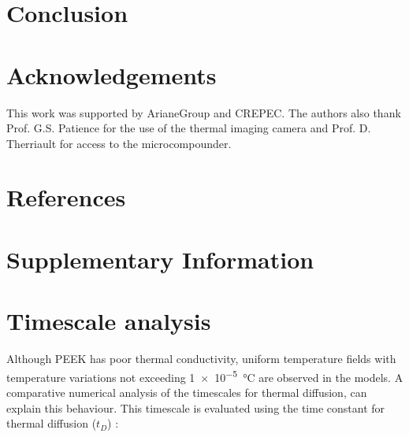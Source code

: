 \documentclass[11pt,review,times]{elsarticle}
\begin{document}
							\section{Conclusion}



							\section{Acknowledgements}

This work was supported by ArianeGroup and CREPEC. 
The authors also thank Prof. G.S. Patience for the use of the thermal imaging camera and Prof. D. Therriault for access to the microcompounder. 

							\section*{References}






							\section*{Supplementary Information}

\section{Timescale analysis}

Although PEEK has poor thermal conductivity, uniform temperature fields with temperature variations not exceeding \SI{1e-5}{\celsius} are observed in the models. 
A comparative numerical analysis of the timescales for thermal diffusion, can explain this behaviour. 
This timescale is evaluated using the time constant for thermal diffusion ($t_D$) : 
\end{document}
